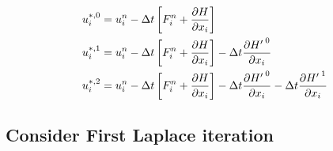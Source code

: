 \newpage


\begin{align}
u_i^{*,{0}} & = u_i^n - \Delta t \left[ F_i^n + \frac{\partial {H}}{\partial x_i} \right]     \nonumber \\
u_i^{*,{1}} & = u_i^n - \Delta t \left[ F_i^n + \frac{\partial {H}}{\partial x_i} \right] - \Delta t \frac{\partial {{H'\,}}^{0}}{\partial x_i}      \nonumber \\
u_i^{*,{2}} & = u_i^n - \Delta t \left[ F_i^n + \frac{\partial {H}}{\partial x_i} \right] - \Delta t  \frac{\partial {{H'\,}}^{0}}{\partial x_i} - \Delta t  \frac{\partial {{H'\,}}^{1}}{\partial x_i}     \nonumber \\
 \end{align}

\subsection{Consider First Laplace iteration}

%
%
%





